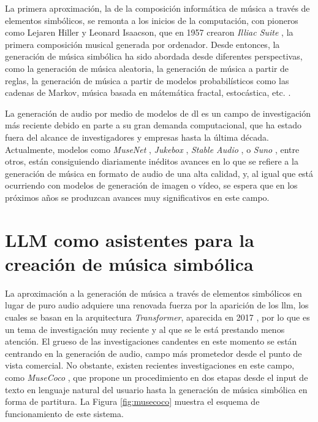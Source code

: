 La primera aproximación, la de la composición informática de música a través de elementos simbólicos, se remonta a los inicios de la computación, con pioneros como Lejaren Hiller y Leonard Isaacson, que en 1957 crearon \textit{Illiac Suite} \citep{arizaTwoPioneeringProjects2011,funkMusicalSuiteComposed2018}, la primera composición musical generada por ordenador. Desde entonces, la generación de música simbólica ha sido abordada desde diferentes perspectivas, como la generación de música aleatoria, la generación de música a partir de reglas, la generación de música a partir de modelos probabilísticos como las cadenas de Markov, música basada en mátemática fractal, estocástica, etc. \citep{hernandez-olivanSurveyArtificialIntelligence2022}. 

La generación de audio por medio de modelos de \gls{dl} es un campo de investigación más reciente debido en parte a su gran demanda computacional, que ha estado fuera del alcance de investigadores y empresas hasta la última década. Actualmente, modelos como \textit{MuseNet}  \citep{departmentofcomputersciencesrminstituteofscienceandtechnologychennaiindia.MusenetMusicGeneration2020a}, \textit{Jukebox} \citep{dhariwalJukeboxGenerativeModel2020}, \textit{Stable Audio} \cite{StableAudioFast}, o \textit{Suno} \citep{SunoAI}, entre otros, están consiguiendo diariamente inéditos avances en lo que se refiere a la generación de música en formato de audio de una alta calidad, y, al igual que está ocurriendo con modelos de generación de imagen o vídeo, se espera que en los próximos años se produzcan avances muy significativos en este campo.


\section{LLM como asistentes para la creación de música simbólica}
\label{sec:llm_asistentes_creacion_codigo_programacion}

La aproximación a la generación de música a través de elementos simbólicos en lugar de puro audio adquiere una renovada fuerza por la aparición de los \gls{llm}, los cuales se basan en la arquitectura \textit{Transformer}, aparecida en 2017 \citep{vaswaniAttentionAllYou2017}, por lo que es un tema de investigación muy reciente y al que se le está prestando menos atención. El grueso de las investigaciones candentes en este momento se están centrando en la generación de audio, campo más prometedor desde el punto de vista comercial. No obstante, existen recientes investigaciones en este campo, como \textit{MuseCoco} \citep{luMuseCocoGeneratingSymbolic2023}, que propone un procedimiento en dos etapas desde el input de texto en lenguaje natural del usuario hasta la generación de música simbólica en forma de partitura. La Figura \ref{fig:musecoco} muestra el esquema de funcionamiento de este sistema. 

